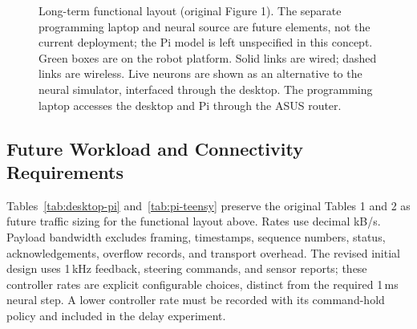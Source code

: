 \begin{figure}[H]
\caption{Long-term functional layout (original Figure 1). The separate programming laptop and neural source are future elements, not the current deployment; the Pi model is left unspecified in this concept. Green boxes are on the robot platform. Solid links are wired; dashed links are wireless. Live neurons are shown as an alternative to the neural simulator, interfaced through the desktop. The programming laptop accesses the desktop and Pi through the ASUS router.}
\label{fig:functional-topology}
\end{figure}

\subsection{Future Workload and Connectivity Requirements}
Tables~\ref{tab:desktop-pi} and~\ref{tab:pi-teensy} preserve the original Tables 1 and 2 as future traffic sizing for the functional layout above. Rates use decimal kB/s. Payload bandwidth excludes framing, timestamps, sequence numbers, status, acknowledgements, overflow records, and transport overhead. The revised initial design uses 1\,kHz feedback, steering commands, and sensor reports; these controller rates are explicit configurable choices, distinct from the required 1\,ms neural step. A lower controller rate must be recorded with its command-hold policy and included in the delay experiment.

